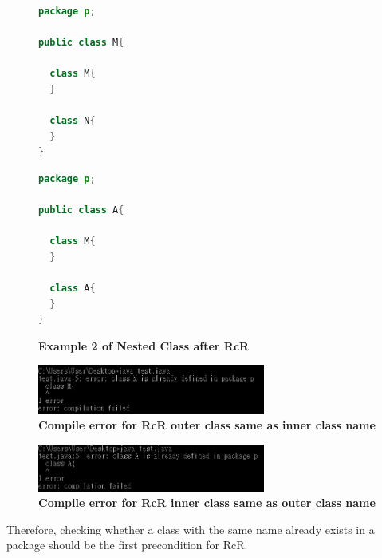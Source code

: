 \begin{figure}[th]
\centering
\begin{minipage}[t]{0.45\linewidth}
\begin{lstlisting}[language=java, basicstyle=\scriptsize\ttfamily,frame=single]
package p;

public class M{	
  
  class M{
  }
	
  class N{
  }
} 
\end{lstlisting}
\end{minipage}
\hfill
\begin{minipage}[t]{0.45\linewidth}
\begin{lstlisting}[language=java, basicstyle=\scriptsize\ttfamily,frame=single]
package p;

public class A{	
    
  class M{
  }
    
  class A{
  }
} 
\end{lstlisting}
\end{minipage}
\caption{\textbf{Example 2 of Nested Class after RcR}}
\label{fig:nestedclass2}
\end{figure}

\begin{figure}[H]
\centerline{\includegraphics[width=75mm,scale=0.4]{NC2.jpg}}
\caption{\textbf{Compile error for RcR outer class same as inner class name}}
\label{fig:NC2}
\end{figure}

\begin{figure}[H]
\centerline{\includegraphics[width=75mm,scale=0.4]{NC3.jpg}}
\caption{\textbf{Compile error for RcR inner class same as outer class name}}
\label{fig:NC3}
\end{figure}

Therefore, checking whether a class with the same name already exists in a package should be the first precondition for RcR. 
   
